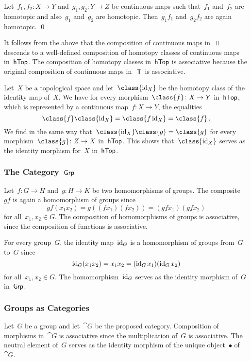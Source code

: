 \begin{corollary}
	\label{homotopy respects composition}
	Let~$f_1, f_2 \colon X \to Y$ and~$g_1, g_2 \colon Y \to Z$ be continuous maps such that~$f_1$ and~$f_2$ are homotopic and also~$g_1$ and~$g_2$ are homotopic.
	Then~$g_1 f_1$ and~$g_2 f_2$ are again homotopic.
	\qed
\end{corollary}

It follows from the above  that the composition of continuous maps in~$\Top$ descends to a well-defined composition of homotopy classes of continuous maps in~$\mathsf{hTop}$.
The composition of homotopy classes in~$\mathsf{hTop}$ is associative because the original composition of continuous maps in~$\Top$ is associative.

Let~$X$ be a topological space and let~$\class{\id_X}$ be the homotopy class of the identity map of~$X$.
We have for every morphism~$\class{f} \colon X \to Y$ in~$\mathsf{hTop}$, which is represented by a continuous map~$f \colon X \to Y$, the equalities
\[
	\class{f} \class{\id_X}
	=
	\class{f \id_X}
	=
	\class{f} \,.
\]
We find in the same way that~$\class{\id_X} \class{g} = \class{g}$ for every morphism~$\class{g} \colon Z \to X$ in~$\mathsf{hTop}$.
This shows that~$\class{\id_X}$ serves as the identity morphism for~$X$ in~$\mathsf{hTop}$.



\subsubsection{The Category~$\mathsf{Grp}$}

Let~$f \colon G \to H$ and~$g \colon H \to K$ be two homomorphisms of groups.
The composite~$g f$ is again a homomorphism of groups since
\[
	g f (x_1 x_2) = g ((f x_1) (f x_2)) = (g f x_1) (g f x_2)
\]
for all~$x_1, x_2 ∈ G$.
The composition of homomorphisms of groups is associative, since the composition of functions is associative.

For every group~$G$, the identity map~$\operatorname{id}_G$ is a homomorphism of groups from~$G$ to~$G$ since
\[
	\operatorname{id}_G (x_1 x_2) = x_1 x_2 = (\operatorname{id}_G x_1) (\operatorname{id}_G x_2)
\]
for all~$x_1, x_2 ∈ G$.
The homomorphism~$\operatorname{id}_G$ serves as the identity morphism of~$G$ in~$\mathsf{Grp}$.



\subsubsection{Groups as Categories}

Let~$G$ be a group and let~$\cat{G}$ be the proposed category.
Composition of morphisms in~$\cat{G}$ is associative since the multiplication of~$G$ is associative.
The neutral element of~$G$ serves as the identity morphism of the unique object~$\bullet$ of~$\cat{G}$.



